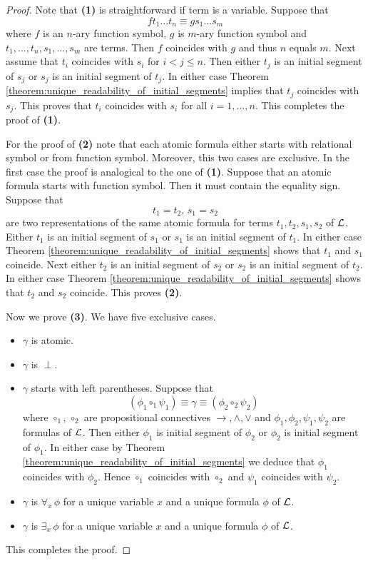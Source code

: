\documentclass[10pt]{amsart}
\begin{document}
\begin{proof}
	Note that \textbf{(1)} is straightforward if term is a variable. Suppose that
	$$ft_1 ...t_n \equiv gs_1 ...s_m$$
	where $f$ is an $n$-ary function symbol, $g$ is $m$-ary function symbol and $t_1,...,t_n,s_1,...,s_m$ are terms. Then $f$ coincides with $g$ and thus $n$ equals $m$. Next assume that $t_i$ coincides with $s_i$ for $i < j \leq n$. Then either $t_j$ is an initial segment of $s_j$ or $s_j$ is an initial segment of $t_j$. In either case Theorem \ref{theorem:unique_readability_of_initial_segments} implies that $t_j$ coincides with $s_j$. This proves that $t_i$ coincides with $s_i$ for all $i=1,...,n$. This completes the proof of \textbf{(1)}.

	For the proof of \textbf{(2)} note that each atomic formula either starts with relational symbol or from function symbol. Moreover, this two cases are exclusive. In the first case the proof is analogical to the one of \textbf{(1)}. Suppose that an atomic formula starts with function symbol. Then it must contain the equality sign. Suppose that
	$$t_1 = t_2,\,s_1 = s_2$$
	are two representations of the same atomic formula for terms $t_1,t_2,s_1,s_2$ of ${\mathcal L}$. Either $t_1$ is an initial segment of $s_1$ or $s_1$ is an initial segment of $t_1$. In either case Theorem \ref{theorem:unique_readability_of_initial_segments} shows that $t_1$ and $s_1$ coincide. Next either $t_2$ is an initial segment of $s_2$ or $s_2$ is an initial segment of $t_2$. In either case Theorem \ref{theorem:unique_readability_of_initial_segments} shows that $t_2$ and $s_2$ coincide. This proves \textbf{(2)}.

	Now we prove \textbf{(3)}. We have five exclusive cases.
	\begin{itemize}
		\item $\gamma$ is atomic.
		\item $\gamma$ is $\perp$.
		\item $\gamma$ starts with left parentheses. Suppose that
		      $$\left(\phi_1 \circ_1 \psi_1\right)\equiv \gamma \equiv \left(\phi_2 \circ_2 \psi_2\right)$$
		      where $\circ_1,\,\circ_2$ are propositional connectives $\rightarrow,\wedge,\vee$ and $\phi_1,\phi_2,\psi_1,\psi_2$ are formulas of ${\mathcal L}$. Then either $\phi_1$ is initial segment of $\phi_2$ or $\phi_2$ is initial segment of $\phi_1$. In either case by Theorem \ref{theorem:unique_readability_of_initial_segments} we deduce that $\phi_1$ coincides with $\phi_2$. Hence $\circ_1$ coincides with $\circ_2$ and $\psi_1$ coincides with $\psi_2$.
		\item $\gamma$ is $\forall_x\,\phi$ for a unique variable $x$ and a unique formula $\phi$ of ${\mathcal L}$.
		\item $\gamma$ is $\exists_x\,\phi$ for a unique variable $x$ and a unique formula $\phi$ of ${\mathcal L}$.
	\end{itemize}
	This completes the proof.
\end{proof}
\end{document}
